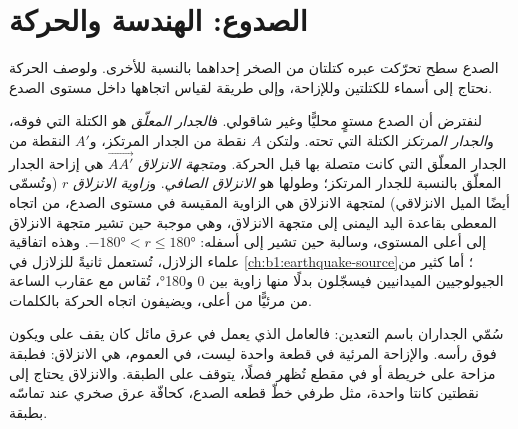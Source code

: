 \section{الصدوع: الهندسة والحركة}\label{sec:b1:faults-folds-fabrics:faults}

الصدع سطح تحرّكت عبره كتلتان من الصخر إحداهما بالنسبة للأخرى. ولوصف الحركة نحتاج إلى أسماء للكتلتين وللإزاحة، وإلى طريقة لقياس اتجاهها داخل مستوى الصدع.

\begin{definition}\label{def:b1:faults-folds-fabrics:fault-elements}
لنفترض أن الصدع مستوٍ محليًّا وغير شاقولي. ف\emph{الجدار المعلّق} هو الكتلة التي فوقه، و\emph{الجدار المرتكز} الكتلة التي تحته. ولتكن $A$ نقطة من الجدار المرتكز، و$A'$ النقطة من الجدار المعلّق التي كانت متصلة بها قبل الحركة. و\emph{متجهة الانزلاق} $\overrightarrow{AA'}$ هي إزاحة الجدار المعلّق بالنسبة للجدار المرتكز؛ وطولها هو \emph{الانزلاق الصافي}. و\emph{زاوية الانزلاق} $r$ (وتُسمّى أيضًا الميل الانزلاقي) لمتجهة الانزلاق هي الزاوية المقيسة في مستوى الصدع، من اتجاه  المعطى بقاعدة اليد اليمنى إلى متجهة الانزلاق، وهي موجبة حين تشير متجهة الانزلاق إلى أعلى المستوى، وسالبة حين تشير إلى أسفله: $\ang{-180} < r \le \ang{180}$. وهذه اتفاقية علماء الزلازل، تُستعمل ثانيةً للزلازل في \cref{ch:b1:earthquake-source}؛ أما كثير من الجيولوجيين الميدانيين فيسجّلون بدلًا منها زاوية بين 0 و\ang{180}، تُقاس مع عقارب الساعة من  مرئيًّا من أعلى، ويضيفون اتجاه الحركة بالكلمات.
\end{definition}

سُمّي الجداران باسم التعدين: فالعامل الذي يعمل في عرق مائل كان يقف على  ويكون  فوق رأسه. والإزاحة المرئية في قطعة واحدة ليست، في العموم، هي الانزلاق: فطبقة مزاحة على خريطة أو في مقطع تُظهر فصلًا، يتوقف على  الطبقة. والانزلاق يحتاج إلى نقطتين كانتا واحدة، مثل طرفي خطّ قطعه الصدع، كحافّة عرق صخري عند تماسّه بطبقة.

